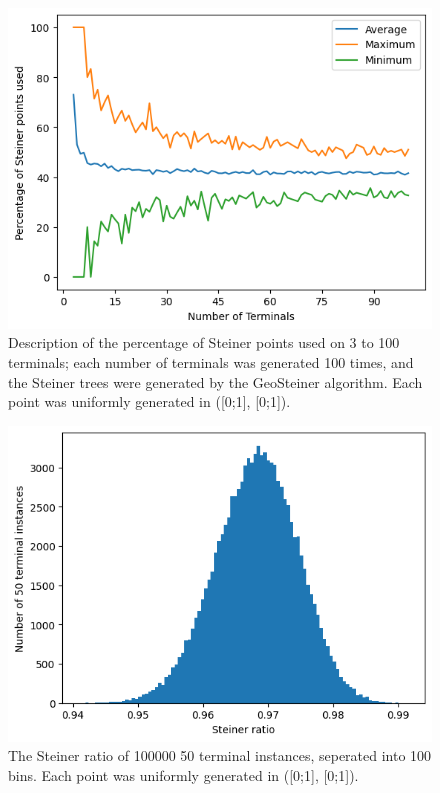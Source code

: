 \documentclass{mpaper}
\begin{document}
\begin{figure}
  \begin{center}
  \includegraphics[scale=0.5]{plot1.png}
  \end{center}
  \caption{\label{fig:2}Description of the percentage of Steiner points used on 3 to 100 terminals; each number of terminals was generated 100 times, and the Steiner trees were generated by the GeoSteiner algorithm. Each point was uniformly generated in ([0;1], [0;1]). }
\end{figure}

\begin{figure}
  \begin{center}
  \includegraphics[scale=0.5]{plot5.png}
  \end{center}
  \caption{\label{fig:5} The Steiner ratio of 100000 50 terminal instances, seperated into 100 bins. Each point was uniformly generated in ([0;1], [0;1]).}
\end{figure}
\end{document}
